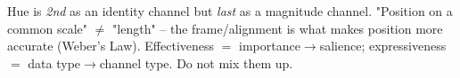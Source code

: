 \begin{pitfall}
Hue is \emph{2nd} as an identity channel but \emph{last} as a magnitude channel.
"Position on a common scale" $\neq$ "length" -- the frame/alignment is what makes
position more accurate (Weber's Law). Effectiveness $=$ importance$\to$salience;
expressiveness $=$ data type$\to$channel type. Do not mix them up.
\end{pitfall}

